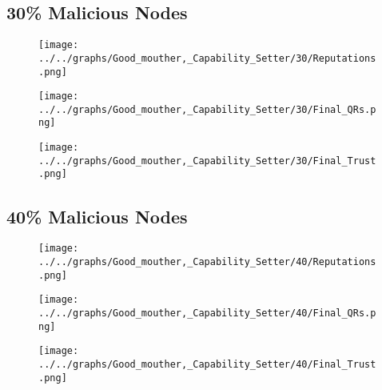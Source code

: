 \begin{minipage}[t]{0.49\columnwidth}
\subsection*{30\% Malicious Nodes}
    \begin{figure}[H]
        \centering
        \texttt{[image: ../../graphs/Good\_mouther,\_Capability\_Setter/30/Reputations.png]}
    \end{figure}
    \begin{figure}[H]
        \centering
        \texttt{[image: ../../graphs/Good\_mouther,\_Capability\_Setter/30/Final\_QRs.png]}
    \end{figure}
\end{minipage}
\begin{minipage}[t]{0.49\columnwidth}
    \begin{figure}[H]
        \centering
        \texttt{[image: ../../graphs/Good\_mouther,\_Capability\_Setter/30/Final\_Trust.png]}
    \end{figure}
\end{minipage}

\begin{minipage}[t]{0.49\columnwidth}
\subsection*{40\% Malicious Nodes}
    \begin{figure}[H]
        \centering
        \texttt{[image: ../../graphs/Good\_mouther,\_Capability\_Setter/40/Reputations.png]}
    \end{figure}
    \begin{figure}[H]
        \centering
        \texttt{[image: ../../graphs/Good\_mouther,\_Capability\_Setter/40/Final\_QRs.png]}
    \end{figure}
\end{minipage}
\begin{minipage}[t]{0.49\columnwidth}
    \begin{figure}[H]
        \centering
        \texttt{[image: ../../graphs/Good\_mouther,\_Capability\_Setter/40/Final\_Trust.png]}
    \end{figure}
\end{minipage}

